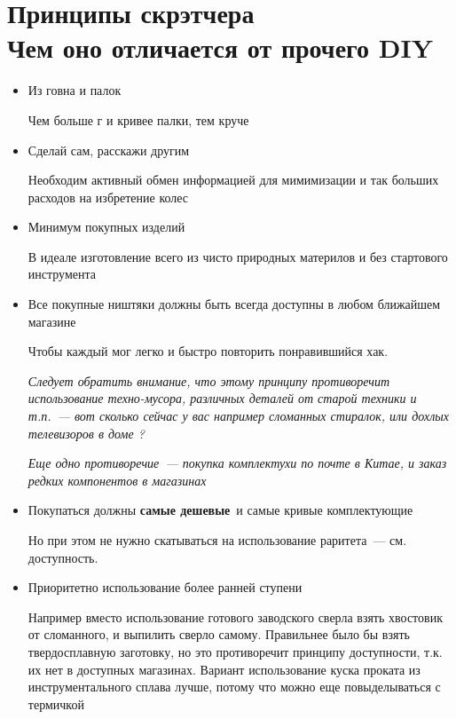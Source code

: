 \documentclass{magazine}
\begin{document}
\section{Принципы скрэтчера\\Чем оно отличается от прочего DIY}
\begin{multicols}{2}

\begin{itemize}
  
\item Из говна и палок
  
Чем больше г и кривее палки, тем круче \scr
  
\item Сделай сам, расскажи другим
  
Необходим активный обмен информацией для мимимизации и так больших расходов на
избретение колес
  
\item Минимум покупных изделий

В идеале изготовление всего из чисто природных материлов и без стартового
инструмента

\item Все покупные ништяки должны быть всегда доступны в любом ближайшем
магазине

Чтобы каждый мог легко и быстро повторить понравившийся хак.

\emph{Следует обратить внимание, что этому принципу противоречит использование
техно-мусора, различных деталей от старой техники и т.п.\ --- вот сколько
сейчас у вас например сломанных стиралок, или дохлых телевизоров в доме ?}

\emph{Еще одно противоречие\ --- покупка комплектухи по почте в Китае, и заказ
редких компонентов в магазинах}

\item Покупаться должны \textbf{самые дешевые}\ и самые кривые
комплектующие

Но при этом не нужно скатываться на использование раритета\ --- см. доступность.

\item Приоритетно использование более ранней ступени

Например вместо использование готового заводского сверла взять хвостовик от
сломанного, и выпилить сверло самому. Правильнее было бы взять твердосплавную
заготовку, но это противоречит принципу доступности, т.к. их нет в
доступных магазинах. Вариант использование куска проката из инструментального
сплава лучше, потому что можно еще повыделываться с термичкой \smiley


\end{itemize}
\end{multicols}
\end{document}
